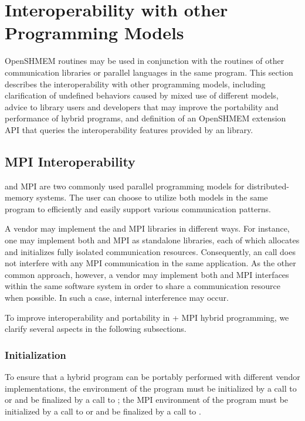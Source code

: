 \color{ForestGreen}
\chapter{Interoperability with other Programming Models}\label{sec:interoperability}

OpenSHMEM routines may be used in conjunction with the routines of other
communication libraries or parallel languages in the same program. This section
describes the interoperability with other programming models, including
clarification of undefined behaviors caused by mixed use of different models,
advice to \openshmem library users and developers that may improve the portability
and performance of hybrid programs, and definition of an OpenSHMEM extension
API that queries the interoperability features provided by an \openshmem library.


\section{MPI Interoperability}

\openshmem and MPI are two commonly used parallel programming models for
distributed-memory systems. The user can choose to utilize both models in the same program
to efficiently and easily support various communication patterns.

A vendor may implement the \openshmem and MPI libraries in different ways. For
instance, one may implement both \openshmem and MPI as standalone libraries,
each of which allocates and initializes fully isolated communication
resources. Consequently, an \openshmem call does not interfere with any MPI
communication in the same application. As the other common approach, however,
a vendor may implement both \openshmem and MPI interfaces within the
same software system in order to share a communication resource when possible.
In such a case, internal interference may occur.

To improve interoperability and portability in \openshmem + MPI hybrid
programming, we clarify several aspects in the following subsections.


\subsection{Initialization}
To ensure that a hybrid program can be portably performed with different vendor
implementations, the \openshmem environment of the program must be initialized by
a call to  or  and be finalized by
a call to ; the MPI environment of the program must be initialized
by a call to  or  and be finalized by a
call to .

